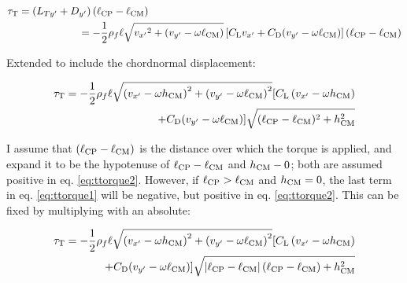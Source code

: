 \documentclass{jfm} %
\begin{document}
\begin{equation}
\begin{split}
\tau_\textnormal{T} = \left ( L_{Ty'} + D_{y'}\right )\left ( \ell_{\textnormal{CP}}- \ell_{\textnormal{CM}} \right )  \hspace{85mm}\\ 
=-\frac{1}{2}\rho_f\ell \sqrt{{v_{x'}}^2+(v_{y'} - \omega \ell_{\textup{CM}})}\left [ C_{\textnormal{L}}{v_{x'}}+C_{\textnormal{D}}(v_{y'} - \omega \ell_{\textup{CM}}) \right ] \left ( \ell_{\textnormal{CP}}- \ell_{\textnormal{CM}} \right ) 
\end{split}
\label{eq:ttorque1}\end{equation}

Extended to include the chordnormal displacement:

\begin{equation}
\begin{split}
\tau_\textnormal{T} = -\frac{1}{2}\rho_f\ell \sqrt{\left ( {v_{x'}}- \omega h_{\textup{CM}} \right )^2+\left (v_{y'} - \omega \ell_{\textup{CM}}\right)^2} [ C_{\textnormal{L}}\left ( {v_{x'}}- \omega h_{\textup{CM}} \right )  \\ +C_{\textnormal{D}}(v_{y'} - \omega \ell_{\textup{CM}}) ] \sqrt{( \ell_{\textnormal{CP}}- \ell_{\textnormal{CM}} )^2 +h_{\textup{CM}}^2 }
\end{split}
\label{eq:ttorque2}\end{equation}

I assume that $\left ( \ell_{\textnormal{CP}}- \ell_{\textnormal{CM}} \right ) $ is the distance over which the torque is applied, and expand it to be the hypotenuse of $\ell_{\textnormal{CP}}- \ell_{\textnormal{CM}}$ and $h_{\textup{CM}}-0$; both are assumed positive in eq. \ref{eq:ttorque2}. However, if $\ell_{\textnormal{CP}} > \ell_{\textnormal{CM}}$ and $h_{\textnormal{CM}} = 0$, the last term in eq. \ref{eq:ttorque1} will be negative, but positive in eq. \ref{eq:ttorque2}. This can be fixed by multiplying with an absolute:

\begin{equation}
\begin{split}
\tau_\textnormal{T} = -\frac{1}{2}\rho_f\ell \sqrt{\left ( {v_{x'}}- \omega h_{\textup{CM}} \right )^2+\left (v_{y'} - \omega \ell_{\textup{CM}}\right)^2}[ C_{\textnormal{L}}\left ( {v_{x'}}- \omega h_{\textup{CM}} \right )\\+C_{\textnormal{D}}(v_{y'} - \omega \ell_{\textup{CM}})  ]\sqrt{ \left| \ell_{\textnormal{CP}}- \ell_{\textnormal{CM}} \right| (\ell_{\textnormal{CP}}- \ell_{\textnormal{CM}} ) +h_{\textup{CM}}^2 }
\end{split}
\label{eq:ttorque3}\end{equation}
\end{document}
